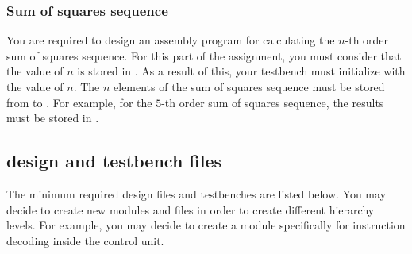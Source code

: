 \documentclass[number=03]{assignment}
\begin{document}
\subsubsection{Sum of squares sequence}
You are required to design an assembly program for calculating the $n$-th order sum of squares sequence.
For this part of the assignment, you must consider that the value of $n$ is stored in . 
As a result of this, your testbench must initialize  with the value of $n$.
The $n$ elements of the sum of squares sequence must be stored from  to . 
For example, for the $5$-th order sum of squares sequence, the results must be stored in .

\subsection{\SV design and testbench files}\label{sec:SV_files}
The minimum required \SV design files and testbenches are listed below.
You may decide to create new \SV modules and files in order to create different hierarchy levels. 
For example, you may decide to create a \SV module specifically for instruction decoding inside the control unit.
\end{document}
